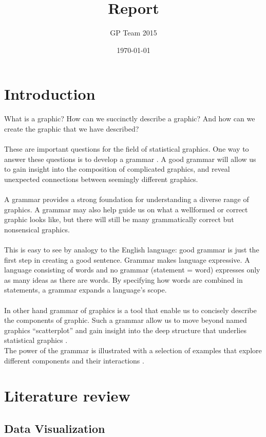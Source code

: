 \documentclass[12pt]{article}
\title{Report}
\author{GP Team 2015}
\date{\today}
\begin{document}
\maketitle
\newpage
\tableofcontents
\newpage

\section{Introduction}
What is a graphic? How can we succinctly describe a graphic? And how can we create the graphic
that we have described? \\
 \\
  These are important questions for the field of statistical graphics.
One way to answer these questions is to develop a grammar . A good grammar will allow us to gain insight
into the composition of complicated graphics, and reveal unexpected connections between seemingly
different graphics. \\ \\
 A grammar provides a strong foundation for understanding a diverse range of graphics.
A grammar may also help guide us on what a well­formed or correct graphic looks like, but there will still
be many grammatically correct but nonsensical graphics.
\\ \\
 This is easy to see by analogy to the English
language: good grammar is just the first step in creating a good sentence. Grammar makes language
expressive. A language consisting of words and no grammar (statement = word) expresses only as many
ideas as there are words. By specifying how words are combined in statements, a grammar expands a
language's scope.
\\ \\
 In other hand grammar of graphics is a tool that enable us to concisely describe the
components of graphic. Such a grammar allow us to move beyond named graphics “scatterplot” and gain
insight into the deep structure that underlies statistical graphics . \\ The power of the grammar is illustrated with a selection of examples that explore different components and their interactions .

\newpage
\section{Literature review}
\subsection{Data Visualization}
\end{document}
